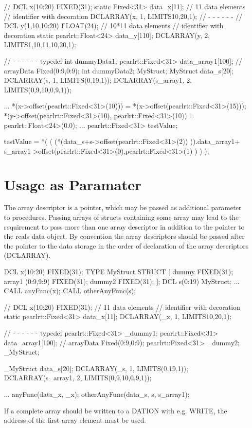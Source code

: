 \begin{CppCode}
// DCL x(10:20) FIXED(31); 
static Fixed<31> data_x[11]; // 11 data elements
                             // identifier with decoration
DCLARRAY(x, 1, LIMITS{{10,20,1}});
// - - - - - - 
// DCL y(1,10,10:20) FLOAT(24); 
 // 10*11 data elements
 // identifier with decoration
static pearlrt::Float<24> data_y[110];
DCLARRAY(y, 2, LIMITS{{1,10,11},{10,20,1}});

// - - - - - - 
   typedef {
      int dummyData1;
      pearlrt::Fixed<31> data_array1[100]; // arrayData Fixed(0:9,0:9);
      int dummyData2;
   } MyStruct;
   MyStruct data_s[20]; 
   DCLARRAY(s, 1, LIMITS({{0,19,1}}));
   DCLARRAY(s_array1, 2, LIMITS({{0,9,10},{0,9,1}}));

...
*(x->offset(pearlrt::Fixed<31>(10))) = *(x->offset(pearlrt::Fixed<31>(15)));
*(y->offset(pearlrt::Fixed<31>(10), pearlrt::Fixed<31>(10)) = pearlrt::Float<24>(0.0);
...
   pearlrt::Fixed<31> testValue;

   testValue = 
       *(
         (
          (*(data_s+s->offset(pearlrt::Fixed<31>(2)) )).data_array1+
             s_array1->offset(pearlrt::Fixed<31>(0),pearlrt::Fixed<31>(1)
          )
         )
        );

\end{CppCode}

\section{Usage as Paramater}
The array descriptor is a pointer, which may be passed as additional parameter
to procedures. 
Passing arrays of structs containing some array may lead to the requirement
to pass more than one array descriptor in addition to the pointer to the 
reals data object.
By convention the array descriptors should be passed after the pointer to the
data storage in the order of declaration of the array descriptors (DCLARRAY).

\begin{PEARLCode}
DCL x(10:20) FIXED(31); 
TYPE MyStruct STRUCT [
           dummy FIXED(31);
           array1 (0:9,9:9) FIXED(31);
           dummy2 FIXED(31);
           ];
DCL s(0:19) MyStruct;
...
CALL anyFunc(x);
CALL otherAnyFunc(s);
\end{PEARLCode}

\begin{CppCode}
// DCL x(10:20) FIXED(31); 
 // 11 data elements
 // identifier with decoration
static pearlrt::Fixed<31> data_x[11];
DCLARRAY(_x, 1, LIMITS{{10,20,1}});

// - - - - - - 
   typedef {
      pearlrt::Fixed<31> _dummy1;
      pearlrt::Fixed<31> data_array1[100]; // arrayData Fixed(0:9,0:9);
      pearlrt::Fixed<31> _dummy2;
   } _MyStruct;

   _MyStruct data_s[20]; 
   DCLARRAY(_s, 1, LIMITS({{0,19,1}}));
   DCLARRAY(s_array1, 2, LIMITS({{0,9,10},{0,9,1}}));

...
   anyFunc(data_x, _x);
   otherAnyFunc(data_s, s, s_array1);
\end{CppCode}

If a complete array should be written to a DATION with e.g. WRITE,
the address of the first array element must be used.


